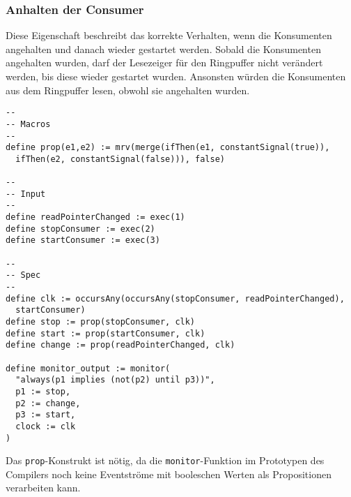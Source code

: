 \documentclass{article}
\begin{document}
\subsubsection{Anhalten der Consumer}

Diese Eigenschaft beschreibt das korrekte Verhalten, wenn die Konsumenten angehalten und danach wieder gestartet werden.
Sobald die Konsumenten angehalten wurden, darf der Lesezeiger für den Ringpuffer nicht verändert werden, bis diese wieder gestartet wurden. Ansonsten würden die Konsumenten aus dem Ringpuffer lesen, obwohl sie angehalten wurden.

\begin{lstlisting}[language=tessla+salt]
--
-- Macros
--
define prop(e1,e2) := mrv(merge(ifThen(e1, constantSignal(true)),
  ifThen(e2, constantSignal(false))), false)

--
-- Input
--
define readPointerChanged := exec(1)
define stopConsumer := exec(2)
define startConsumer := exec(3)

--
-- Spec
--
define clk := occursAny(occursAny(stopConsumer, readPointerChanged),
  startConsumer)
define stop := prop(stopConsumer, clk)
define start := prop(startConsumer, clk)
define change := prop(readPointerChanged, clk)

define monitor_output := monitor(
  "always(p1 implies (not(p2) until p3))",
  p1 := stop,
  p2 := change,
  p3 := start,
  clock := clk
)
\end{lstlisting}

Das \texttt{prop}-Konstrukt ist nötig, da die \texttt{monitor}-Funktion im Prototypen des Compilers noch keine Eventströme mit booleschen Werten als Propositionen verarbeiten kann.
\end{document}
